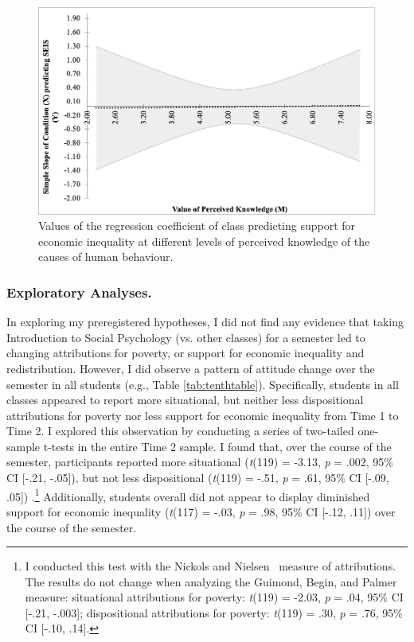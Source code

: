 \documentclass{sfuthesis}
\begin{document}
\begin{figure}[h]
  \begin{center}
    \includegraphics[scale=.40]{Fig5-1.png}
    \caption{Values of the regression coefficient of class predicting support for economic inequality at different levels of perceived knowledge of the causes of human behaviour.}
    \label{fig:twelvthfig}
  \end{center}
\end{figure}

\subsubsection{Exploratory Analyses.}

In exploring my preregistered hypotheses, I did not find any evidence that taking Introduction to Social Psychology (vs. other classes) for a semester led to changing attributions for poverty, or support for economic inequality and redistribution. However, I did observe a pattern of attitude change over the semester in all students (e.g., Table \ref{tab:tenthtable}). Specifically, students in all classes appeared to report more situational, but neither less dispositional attributions for poverty nor less support for economic inequality from Time 1 to Time 2. I explored this observation by conducting a series of two-tailed one-sample t-tests in the entire Time 2 sample. I found that, over the course of the semester, participants reported more situational (\textit{t}(119) = -3.13, \textit{p} = .002, 95\% CI [-.21, -.05]), but not less dispositional (\textit{t}(119) = -.51, \textit{p} = .61, 95\% CI [-.09, .05]) .\footnote{I conducted this test with the Nickols and Nielsen~\cite{nickols11} measure of attributions. The results do not change when analyzing the Guimond, Begin, and Palmer~\cite{guimond89} measure: situational attributions for poverty: \textit{t}(119) = -2.03, \textit{p} = .04, 95\% CI [-.21, -.003]; dispositional attributions for poverty: \textit{t}(119) = .30, \textit{p} = .76, 95\% CI [-.10, .14].} Additionally, students overall did not appear to display diminished support for economic inequality (\textit{t}(117) = -.03, \textit{p} = .98, 95\% CI [-.12, .11]) over the course of the semester.
\end{document}
